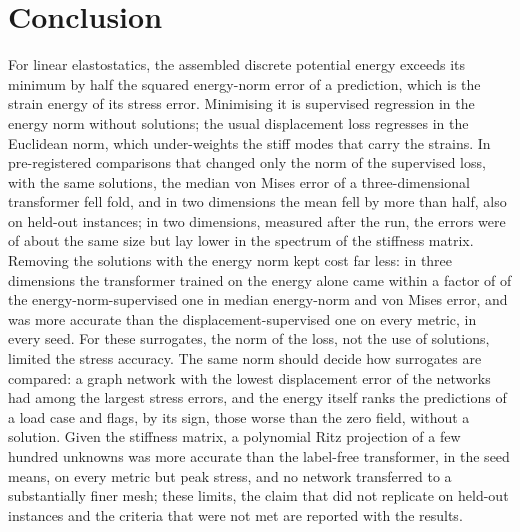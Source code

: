 \section{Conclusion}\label{sec:conclusion}

For linear elastostatics, the assembled discrete potential energy exceeds its minimum by half
the squared energy-norm error of a prediction, which is the strain energy of its stress error.
Minimising it is supervised regression in the energy norm without solutions; the usual
displacement loss regresses in the Euclidean norm, which under-weights the stiff modes that
carry the strains. In pre-registered comparisons that changed only the norm of the
supervised loss, with the same solutions, the median von Mises error of a three-dimensional
transformer fell \numNlThreeNormVmWord{}fold, and in two dimensions the mean fell by more than
half, also on held-out instances; in two dimensions, measured after the run, the errors were
of about the same size but lay lower in the spectrum of the stiffness matrix. Removing the
solutions with the energy norm kept cost far less: in three dimensions the transformer
trained on the energy alone came within a factor of \numNlThreeLabelWithin{} of the
energy-norm-supervised one in median energy-norm and von Mises error, and was more accurate
than the displacement-supervised one on every metric, in every seed. For these surrogates,
the norm of the loss, not the use of solutions, limited the stress accuracy. The same norm
should decide how surrogates are compared: a graph network with the lowest displacement error
of the networks had among the largest stress errors, and the energy itself ranks the
predictions of a load case and flags, by its sign, those worse than the zero field, without a
solution. Given the stiffness matrix, a polynomial Ritz projection of a few hundred unknowns
was more accurate than the label-free transformer, in the seed means, on every metric but
peak stress, and no network transferred to a substantially finer mesh; these limits, the
claim that did not replicate on held-out instances and the criteria that were not met are
reported with the results.
